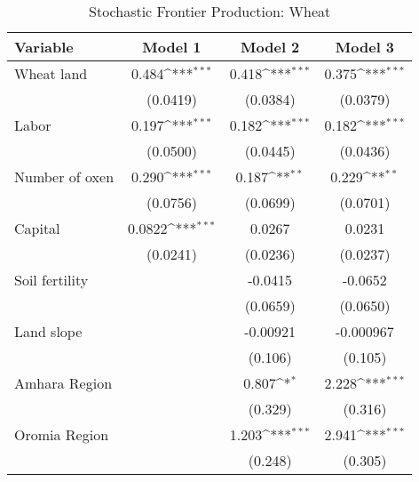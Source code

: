 \documentclass{beamer}
\def\sym#1{\ifmmode^{#1}\else\(^{#1}\)\fi}
\begin{document}
\begin{frame}[shrink=40]
\begin{table}\centering
\small
\caption{Stochastic Frontier Production: Wheat}
\begin{tabular}{l c c c}
\hline\hline 
\textbf{Variable} & \textbf{Model 1} & \textbf{Model 2} & \textbf{Model 3}\\ \hline
Wheat land      &       0.484\sym{***}&       0.418\sym{***}&       0.375\sym{***}\\
                    &    (0.0419)         &    (0.0384)         &    (0.0379)         \\

Labor          &       0.197\sym{***}&       0.182\sym{***}&       0.182\sym{***}\\
                    &    (0.0500)         &    (0.0445)         &    (0.0436)         \\

Number of oxen          &       0.290\sym{***}&       0.187\sym{**} &       0.229\sym{**} \\
                    &    (0.0756)         &    (0.0699)         &    (0.0701)         \\

Capital       &      0.0822\sym{***}&      0.0267         &      0.0231         \\
                    &    (0.0241)         &    (0.0236)         &    (0.0237)         \\

Soil fertility        &                     &     -0.0415         &     -0.0652         \\
                    &                     &    (0.0659)         &    (0.0650)         \\

Land slope         &                     &    -0.00921         &   -0.000967         \\
                    &                     &     (0.106)         &     (0.105)         \\

Amhara Region       &                     &       0.807\sym{*}  &       2.228\sym{***}\\
                    &                     &     (0.329)         &     (0.316)         \\

Oromia Region       &                     &       1.203\sym{***}&       2.941\sym{***}\\
                    &                     &     (0.248)         &     (0.305)         \\


\end{tabular}
\end{table}
\end{frame}
\end{document}
